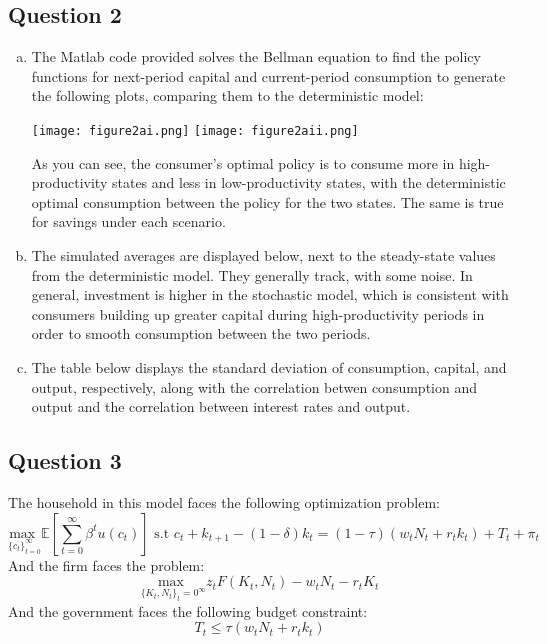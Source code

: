 \documentclass{article}
\newcommand{\usmax}[1]{\underset{#1}{\text{max }}}
\newcommand{\E}[1]{\mathbb{E}\left[#1\right]} %
\begin{document}
\subsection*{Question 2}

\begin{enumerate}[(a)]
	\item The Matlab code provided solves the Bellman equation to find the policy functions for next-period capital and current-period consumption to generate the following plots, comparing them to the deterministic model:
		\begin{center}
			\texttt{[image: figure2ai.png]} \texttt{[image: figure2aii.png]}
		\end{center}
		As you can see, the consumer's optimal policy is to consume more in high-productivity states and less in low-productivity states, with the deterministic optimal consumption between the policy for the two states. The same is true for savings under each scenario.
	
	\item The simulated averages are displayed below, next to the steady-state values from the deterministic model. They generally track, with some noise. In general, investment is higher in the stochastic model, which is consistent with consumers building up greater capital during high-productivity periods in order to smooth consumption between the two periods.
		
	
	
	\item The table below displays the standard deviation of consumption, capital, and output, respectively, along with the correlation betwen consumption and output and the correlation between interest rates and output.
		
	
	
\end{enumerate}

\pagebreak
\subsection*{Question 3}
The household in this model faces the following optimization problem:
\[
	\usmax{\{c_t\}_{t=0}^\infty}\E{\sum_{t=0}^\infty \beta^tu(c_t)}\text{ s.t }c_t + k_{t+1} - (1-\delta)k_t = (1-\tau)\left(w_tN_t + r_tk_t\right) + T_t + \pi_t
\]
And the firm faces the problem:
\[
	\usmax{\{K_t,N_t\}_t=0^\infty}z_tF(K_t,N_t) - w_tN_t - r_tK_t
\]
And the government faces the following budget constraint:
\[
	T_t \leq \tau(w_tN_t + r_tk_t)
\]
\end{document}
